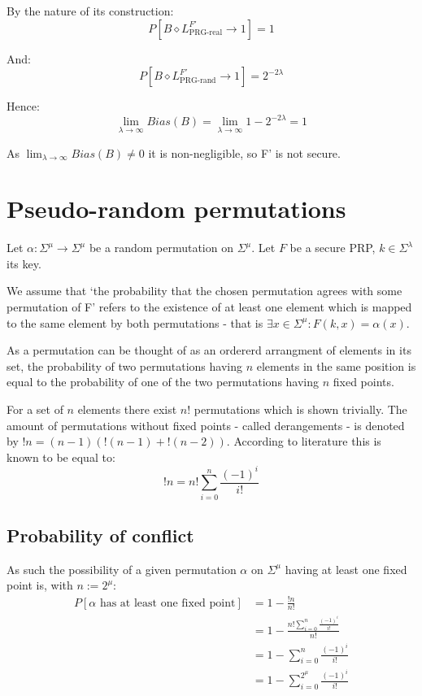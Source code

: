 \documentclass[a4paper]{scrreprt}
\begin{document}
By the nature of its construction:
\[
	P[B \diamond L^{F'}_{\text{PRG-real}} \rightarrow 1] = 1
\]

And:
\[
	P[B \diamond L^{F'}_{\text{PRG-rand}} \rightarrow 1] = 2^{-2\lambda}
\]

Hence:
\[
	\lim_{\lambda \to \infty} Bias(B) = \lim_{\lambda \to \infty} 1 - 2^{-2\lambda} = 1
\]

As $\lim_{\lambda \to \infty} Bias(B) \neq 0$ it is non-negligible, so F' is
not secure.

\section{Pseudo-random permutations}

Let $\alpha: \Sigma^\mu \rightarrow \Sigma^\mu$ be a random permutation on
$\Sigma^\mu$. Let $F$ be a secure PRP, $k \in \Sigma^\lambda$ its key.

We assume that `the probability that the chosen permutation agrees with some
permutation of F' refers to the existence of at least one element which is
mapped to the same element by both permutations - that is $\exists x \in
\Sigma^\mu : F(k, x) = \alpha(x)$.

As a permutation can be thought of as an ordererd arrangment of elements in its
set, the probability of two permutations having $n$ elements in the same
position is equal to the probability of one of the two permutations having $n$
fixed points.

For a set of $n$ elements there exist $n!$ permutations which is shown
trivially. The amount of permutations without fixed points - called
derangements - is denoted by $!n = (n - 1)(!(n - 1) + !(n - 2))$. According to
literature this is known to be equal to:
\[
	!n = n! \sum_{i = 0}^{n} \frac{(-1)^i}{i!}
\]


\subsection{Probability of conflict}

As such the possibility of a given permutation $\alpha$ on $\Sigma^\mu$ having
at least one fixed point is, with $n := 2^\mu$:
\begin{align*}
	P[\alpha \text{ has at least one fixed point}] & = 1 - \frac{!n}{n!} \\
	& = 1 - \frac{n! \sum_{i = 0}^{n} \frac{(-1)^i}{i!}}{n!} \\
	& = 1 - \sum_{i = 0}^{n} \frac{(-1)^i}{i!} \\
	& = 1 - \sum_{i = 0}^{2^\mu} \frac{(-1)^i}{i!}
\end{align*}
\end{document}
